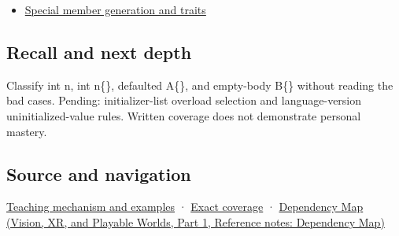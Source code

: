 \hypertarget{appendix-ba8c1a9fe03f-used-by}{}

\begin{itemize}
\tightlist
\item
  \hyperref[appendix-42e02a12c694]{Special member generation and traits}
\end{itemize}

\subsection{Recall and next depth}\label{appendix-ba8c1a9fe03f-recall-and-next-depth}

\hypertarget{appendix-ba8c1a9fe03f-recall-and-next-depth}{}

Classify int n, int n\{\}, defaulted A\{\}, and empty-body B\{\} without reading the bad cases. Pending: initializer-list overload selection and language-version uninitialized-value rules. Written coverage does not demonstrate personal mastery.

\subsection{Source and navigation}\label{appendix-ba8c1a9fe03f-source-and-navigation}

\hypertarget{appendix-ba8c1a9fe03f-source-and-navigation}{}

\hyperref[01-foundations-i-ch003-empty-syntax-does-not-promise-initialized-members]{Teaching mechanism and examples} · \hyperref[appendix-fd090d982a15-m009---parts-127-147]{Exact coverage} · \href{../07-Vision-XR-and-Playable-Worlds-P01/main.pdf\#nameddest=appendix-4ad47bdd269a}{Dependency Map (Vision, XR, and Playable Worlds, Part 1, Reference notes: Dependency Map)}
